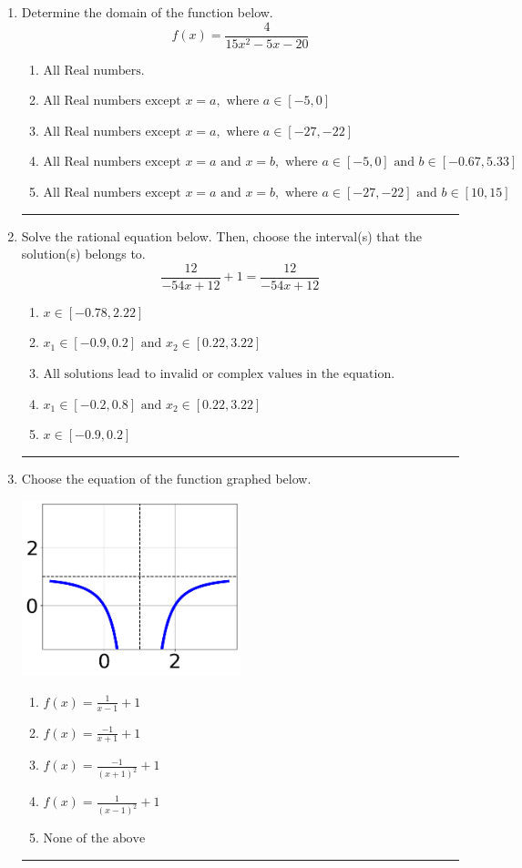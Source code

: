 \documentclass[14pt]{extbook}
\newcommand{\litem}[1]{\item#1\hspace*{-1cm}\rule{\textwidth}{0.4pt}}
\begin{document}
\begin{enumerate}
\litem{
Determine the domain of the function below.\[ f(x) = \frac{4}{15x^{2} -5 x -20} \]\begin{enumerate}[label=\Alph*.]
\item \( \text{All Real numbers.} \)
\item \( \text{All Real numbers except } x = a, \text{ where } a \in [-5, 0] \)
\item \( \text{All Real numbers except } x = a, \text{ where } a \in [-27, -22] \)
\item \( \text{All Real numbers except } x = a \text{ and } x = b, \text{ where } a \in [-5, 0] \text{ and } b \in [-0.67, 5.33] \)
\item \( \text{All Real numbers except } x = a \text{ and } x = b, \text{ where } a \in [-27, -22] \text{ and } b \in [10, 15] \)

\end{enumerate} }
\litem{
Solve the rational equation below. Then, choose the interval(s) that the solution(s) belongs to.\[ \frac{12}{-54x + 12} + 1 = \frac{12}{-54x + 12} \]\begin{enumerate}[label=\Alph*.]
\item \( x \in [-0.78,2.22] \)
\item \( x_1 \in [-0.9, 0.2] \text{ and } x_2 \in [0.22,3.22] \)
\item \( \text{All solutions lead to invalid or complex values in the equation.} \)
\item \( x_1 \in [-0.2, 0.8] \text{ and } x_2 \in [0.22,3.22] \)
\item \( x \in [-0.9,0.2] \)

\end{enumerate} }
\litem{
Choose the equation of the function graphed below.
\begin{center}
    \includegraphics[width=0.5\textwidth]{../Figures/rationalGraphToEquationCopyA.png}
\end{center}
\begin{enumerate}[label=\Alph*.]
\item \( f(x) = \frac{1}{x - 1} + 1 \)
\item \( f(x) = \frac{-1}{x + 1} + 1 \)
\item \( f(x) = \frac{-1}{(x + 1)^2} + 1 \)
\item \( f(x) = \frac{1}{(x - 1)^2} + 1 \)
\item \( \text{None of the above} \)


\end{enumerate}}
\end{enumerate}
\end{document}
